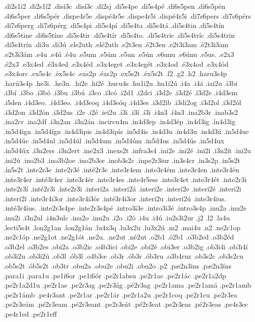 {.di2s1i2
.di2s1í2
.disi3c
.disí3c
.di2sj
.di5s4pe
.di5s4pé
.di6s5pen
.di6s5pén
.di6s5per
.di6s5pér
.dispe4r5e
.dispé4r5e
.dispe4r5i
.dispé4r5i
.di7s6pers
.di7s6pérs
.di7s6perg
.di7s6pérg
.di5s4pi
.di5s4pí
.di5s4ta
.di5s4tá
.di5s4tin
.di5s4tín
.di6s5tine
.di6s5tíne
.di5s4tir
.di5s4tír
.di5s4to.
.di5s4tric
.di5s4tríc
.di5s4trin
.di5s4trín
.di3u
.di3ú
.ele2uth
.elé2uth
.e2t3en
.é2t3en
.e2t3i3am
.é2t3i3am
.e2t3i3ám
.e4u
.e4ú
.é4u
.e5um
.e5úm
.e5un
.e5ún
.e6unu
.e6únu
.e5us.
.e2x3
.é2x3
.e3x4ed
.é3x4ed
.e3x4éd
.e3x4eget
.e3x4egét
.e3x4od
.é3x4od
.e3x4ód
.e3x4orc
.ex5s4c
.éx5s4c
.exs2p
.éxs2p
.ex5s2t
.éx5s2t
.f2
.g2
.h2
.haru3s4p
.harú3s4p
.he3i.
.he3u.
.hi2e
.hi2é
.hucu4s
.hu1i2u
.hu1i2ú
.i4a
.i4á
.iai2u
.i3bi
.i3bí
.i3bo
.i3bó
.i3bu
.i3bú
.i3co
.i3có
.i2d1
.i2dci
.i3d2e
.i3d2é
.í3d2e
.i4d3em
.i5den
.i4d3eo.
.í4d3eo.
.i4d3eoq
.i4d3eóq
.i4d3es
.i3d2ib
.i3di2og
.i3d2ol
.i3d2ól
.i3d2on
.i3d2ón
.i3d2us
.i2e
.i2é
.iei2u
.i3i
.i3í
.í3i
.i4n3
.í4n3
.ina2b3r
.inab3s2
.ina2cr
.ina2df
.i3n2an
.i3n2án
.incircu4m
.in4d3ep
.in4d3ép
.in4d3ig
.ín4d3ig
.in5d4ign
.in5d4ígn
.in4d3ipis
.in4d3ipís
.in5d4is
.in4d3u
.ín4d3u
.in4d3ú
.in5d4uc
.in5d4úc
.in5d4ul
.in5d4úl
.in5d4um
.in5d4úm
.in5d4us
.in5d4ús
.in5d4ux
.in5d4úx
.i3n2ers
.i3n2ert
.ine2x3
.inexs2t
.infra3s4
.ini2e
.ini2é
.ini2í
.i3n2it
.ini2u
.ini2ú
.ino2b3
.ino3b2oe
.ino2b3œ
.inob3s2c
.inpe2r3iur
.in3s4cr
.in3s2p
.in5s2t
.ín5s2t
.inte2r3e
.inte2r3é
.inté2r3e
.inte3r4em
.inte3r4ém
.inte3r4en
.inte3r4én
.inte3r4er
.inté3r4er
.inte3r4ér
.inte3r4es
.inte4r5ess
.inte3r4et
.inte3r4ét
.inte2r3i
.inte2r3í
.inté2r3i
.ínte2r3i
.interi2a
.interi2á
.interi2e
.interí2e
.interi2é
.interi2i
.interi2í
.inte3r4i3or
.inte3r4i3ór
.inté3r4i3or
.interi2u
.interi2ú
.inte3r4ius.
.inté3r4ius.
.inte2r3s4pe
.inte2r3s4pé
.intro3i3e
.intro3i3é
.intro3s4p
.inu2a
.inu2e
.inu2i
.i3n2ul
.i4n3ulc
.inu2o
.inu2u
.i2o
.i2ó
.i4u
.i4ú
.iu2s3i2ur
.j2
.l2
.la4u
.lecti5s4t
.lon2g1an
.lon2g1án
.lu4x3q
.lu3x2u
.lu3x2ú
.m2
.mai4u
.n2
.ne2c1op
.ne2c1óp
.ne2g1ot
.ne2g1ót
.ne2u.
.ne2ut
.né2ut
.o2b1
.ó2b1
.o3b2ed
.o3b2éd
.o3b2el
.o3b2es
.obi2a
.o3b2ic
.o4b3ici
.obi2e
.obi2é
.obi3er
.o3b2ig
.ob3i4i
.ob3i4í
.ob3i2u
.ob3i2ú
.ob3l
.ób3l
.o4b3œ
.ob3r
.ób3r
.ób3ru
.o3b4ruz
.ob3s2c
.ob3s2cu
.ob5s2t
.ób5s2t
.ob3tr
.obu2a
.obu2e
.obu2i
.obu2o
.p2
.pæ2n3ins
.pæ2n3íns
.para1i
.para1u
.pe1i6or
.pe1i6ór
.pe2r1absu
.pe2r1ac
.pe2r1ác
.pe2r1a2dp
.pe2r1a2d1u
.pe2r1ae
.pe2r3ag
.pe2r3ág
.pé2r3ag
.pe2r1ama
.pe2r1amá
.pe2r1amb
.pe2r1ámb
.pe4r3ant
.pe2r1ar
.pe2r1ár
.pe2r1a2u
.pe2r1coq
.pe2r1cu
.pe2r3ea
.pe2r3eám
.pé2r3eam
.pé2r3eant
.pe2r3eát
.pé2r3eat
.pe2r3eas
.pé2r3eas
.pe4r3ec
.pe4r1ed
.pe2r1eff
}
